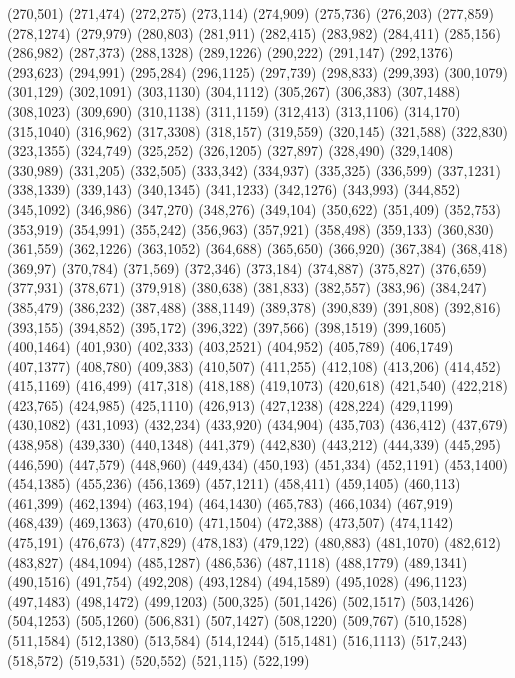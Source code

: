(270,501)
(271,474)
(272,275)
(273,114)
(274,909)
(275,736)
(276,203)
(277,859)
(278,1274)
(279,979)
(280,803)
(281,911)
(282,415)
(283,982)
(284,411)
(285,156)
(286,982)
(287,373)
(288,1328)
(289,1226)
(290,222)
(291,147)
(292,1376)
(293,623)
(294,991)
(295,284)
(296,1125)
(297,739)
(298,833)
(299,393)
(300,1079)
(301,129)
(302,1091)
(303,1130)
(304,1112)
(305,267)
(306,383)
(307,1488)
(308,1023)
(309,690)
(310,1138)
(311,1159)
(312,413)
(313,1106)
(314,170)
(315,1040)
(316,962)
(317,3308)
(318,157)
(319,559)
(320,145)
(321,588)
(322,830)
(323,1355)
(324,749)
(325,252)
(326,1205)
(327,897)
(328,490)
(329,1408)
(330,989)
(331,205)
(332,505)
(333,342)
(334,937)
(335,325)
(336,599)
(337,1231)
(338,1339)
(339,143)
(340,1345)
(341,1233)
(342,1276)
(343,993)
(344,852)
(345,1092)
(346,986)
(347,270)
(348,276)
(349,104)
(350,622)
(351,409)
(352,753)
(353,919)
(354,991)
(355,242)
(356,963)
(357,921)
(358,498)
(359,133)
(360,830)
(361,559)
(362,1226)
(363,1052)
(364,688)
(365,650)
(366,920)
(367,384)
(368,418)
(369,97)
(370,784)
(371,569)
(372,346)
(373,184)
(374,887)
(375,827)
(376,659)
(377,931)
(378,671)
(379,918)
(380,638)
(381,833)
(382,557)
(383,96)
(384,247)
(385,479)
(386,232)
(387,488)
(388,1149)
(389,378)
(390,839)
(391,808)
(392,816)
(393,155)
(394,852)
(395,172)
(396,322)
(397,566)
(398,1519)
(399,1605)
(400,1464)
(401,930)
(402,333)
(403,2521)
(404,952)
(405,789)
(406,1749)
(407,1377)
(408,780)
(409,383)
(410,507)
(411,255)
(412,108)
(413,206)
(414,452)
(415,1169)
(416,499)
(417,318)
(418,188)
(419,1073)
(420,618)
(421,540)
(422,218)
(423,765)
(424,985)
(425,1110)
(426,913)
(427,1238)
(428,224)
(429,1199)
(430,1082)
(431,1093)
(432,234)
(433,920)
(434,904)
(435,703)
(436,412)
(437,679)
(438,958)
(439,330)
(440,1348)
(441,379)
(442,830)
(443,212)
(444,339)
(445,295)
(446,590)
(447,579)
(448,960)
(449,434)
(450,193)
(451,334)
(452,1191)
(453,1400)
(454,1385)
(455,236)
(456,1369)
(457,1211)
(458,411)
(459,1405)
(460,113)
(461,399)
(462,1394)
(463,194)
(464,1430)
(465,783)
(466,1034)
(467,919)
(468,439)
(469,1363)
(470,610)
(471,1504)
(472,388)
(473,507)
(474,1142)
(475,191)
(476,673)
(477,829)
(478,183)
(479,122)
(480,883)
(481,1070)
(482,612)
(483,827)
(484,1094)
(485,1287)
(486,536)
(487,1118)
(488,1779)
(489,1341)
(490,1516)
(491,754)
(492,208)
(493,1284)
(494,1589)
(495,1028)
(496,1123)
(497,1483)
(498,1472)
(499,1203)
(500,325)
(501,1426)
(502,1517)
(503,1426)
(504,1253)
(505,1260)
(506,831)
(507,1427)
(508,1220)
(509,767)
(510,1528)
(511,1584)
(512,1380)
(513,584)
(514,1244)
(515,1481)
(516,1113)
(517,243)
(518,572)
(519,531)
(520,552)
(521,115)
(522,199)
